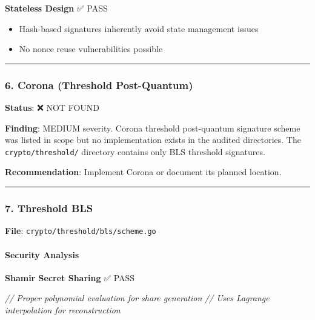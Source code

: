 \documentclass[
]{article}
\newenvironment{Shaded}{}{}
\newcommand{\CommentTok}[1]{\textcolor[rgb]{0.38,0.63,0.69}{\textit{#1}}}
\providecommand{\tightlist}{%
  \setlength{\itemsep}{0pt}\setlength{\parskip}{0pt}}
\begin{document}
\textbf{Stateless Design} ✅ PASS

\begin{itemize}
\tightlist
\item
  Hash-based signatures inherently avoid state management issues
\item
  No nonce reuse vulnerabilities possible
\end{itemize}

\begin{center}\rule{0.5\linewidth}{0.5pt}\end{center}

\subsubsection{6. Corona (Threshold
Post-Quantum)}\label{6-corona-threshold-post-quantum}

\textbf{Status}: ❌ NOT FOUND

\textbf{Finding}: MEDIUM severity. Corona threshold post-quantum
signature scheme was listed in scope but no implementation exists in the
audited directories. The \texttt{crypto/threshold/} directory contains
only BLS threshold signatures.

\textbf{Recommendation}: Implement Corona or document its planned
location.

\begin{center}\rule{0.5\linewidth}{0.5pt}\end{center}

\subsubsection{7. Threshold BLS}\label{7-threshold-bls}

\textbf{File}: \texttt{crypto/threshold/bls/scheme.go}

\paragraph{Security Analysis}\label{security-analysis-5}

\textbf{Shamir Secret Sharing} ✅ PASS

\begin{Shaded}
\begin{Highlighting}[]
\CommentTok{// Proper polynomial evaluation for share generation}
\CommentTok{// Uses Lagrange interpolation for reconstruction}
\end{Highlighting}
\end{Shaded}
\end{document}
